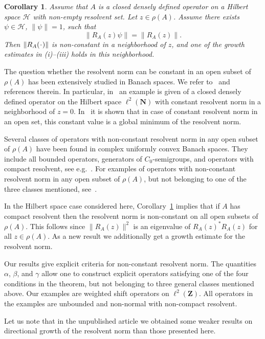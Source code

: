\documentclass[12pt,a4paper]{article}
\numberwithin{equation}{section}
\theoremstyle{plain}
\newtheorem{corollary}[theorem]{Corollary}
\theoremstyle{definition}
\newcommand{\norm}[1]{\lVert{#1}\rVert} %
\newcommand{\any}{\mkern1mu\cdot\mkern1mu}
\newcommand{\cH}{\mathcal{H}}
\newcommand{\bN}{\mathbf{N}}
\newcommand{\bZ}{\mathbf{Z}}
\begin{document}
\begin{corollary}\label{cor}
	Assume that $A$ is a closed densely defined operator on a Hilbert space $\cH$ with non-empty resolvent set. Let $z\in\rho(A)$. Assume there exists $\psi\in\cH$, $\norm{\psi}=1$, such that 
	\begin{equation*}
		\norm{R_A(z)\psi}=\norm{R_A(z)}.
	\end{equation*}
	Then $\norm{R_A(\any)}$ is non-constant in a neighborhood of $z$, and one of the growth estimates in \textup{(i)--(iii)} holds in this neighborhood. 
\end{corollary}

The question whether the resolvent norm can be constant in an open subset of $\rho(A)$ has been extensively studied in Banach spaces. We refer to~\cite{S2,DS} and references therein. In particular, in~\cite[Theorem~3.2]{S2} an example is given of a closed densely defined operator on the Hilbert space $\ell^2(\bN)$ with constant resolvent norm in a neighborhood of $z=0$. In~\cite{BS} it is shown that in case of constant resolvent norm in an open set, this constant value is a global minimum of the resolvent norm.

Several classes of operators with non-constant resolvent norm in any open subset of $\rho(A)$ have been found in complex uniformly convex Banach spaces. They include all bounded operators, generators of $C_0$-semigroups, and operators with compact resolvent, see e.g.~\cite{BGS,DS,S2,S}. For examples of operators with non-constant resolvent norm in any open subset of $\rho(A)$, but not belonging to one of the three classes mentioned, see~\cite{BS}.

In the Hilbert space case considered here, Corollary~\ref{cor} implies that if $A$ has compact resolvent then the resolvent norm is non-constant on all open subsets of $\rho(A)$. This follows since $\norm{R_A(z)}^2$ is an eigenvalue of $R_A(z)^{\ast}R_A(z)$ for all $z\in\rho(A)$. As a new result we additionally get a growth estimate for the resolvent norm.

Our results give explicit criteria for non-constant resolvent norm. The quantities $\alpha$, $\beta$, and $\gamma$ allow one to construct explicit operators satisfying one of the four conditions in the theorem, but not belonging to three general classes mentioned above. Our examples are weighted shift operators on $\ell^2(\bZ)$. All operators in the examples are unbounded and non-normal with non-compact resolvent.

Let us note that in the unpublished article \cite{CGJK} we obtained some weaker results on directional growth of the resolvent norm than those presented here.
\end{document}
